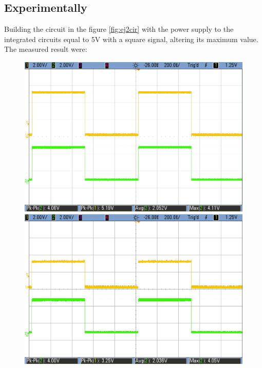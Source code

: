 	\subsection{\color{purple}Experimentally}
	
	Building the circuit in the figure \ref{fig:ej2cir} with the power supply to the integrated circuits equal to 5V with a square signal, altering its maximum value. The measured result were:
	
	\begin{figure}[h!]
        \centering
        \includegraphics[scale=0.19]{HC-LS-5V.png}\hspace{1cm}
        \includegraphics[scale=0.19]{HC-LS-3V.png}\\
		\vspace{0.2cm}
		\hspace{0.9cm}

\end{figure}
